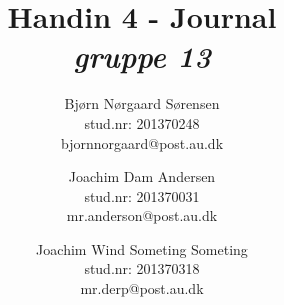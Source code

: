 

	\chead{\myTitle}	\rhead{\today}
\lfoot{}		\cfoot{}			\rfoot{\thepage}
\renewcommand{\headrulewidth}{1pt}
\renewcommand{\footrulewidth}{0pt}

\newcommand{\myTitle}{\textbf{Handin 4 - Journal}}
\newcommand{\mySubTitle}{\textit{gruppe 13}}

\title{\myTitle \\ \mySubTitle}
\author{
	Bjørn Nørgaard Sørensen\\
	stud.nr: 201370248\\
	bjornnorgaard@post.au.dk
	\and
	Joachim Dam Andersen\\
	stud.nr: 201370031\\
	mr.anderson@post.au.dk
	\and
	Joachim Wind Someting Someting\\
	stud.nr: 201370318\\
	mr.derp@post.au.dk
}


	\maketitle							%
		\newpage
	
	
	
	

